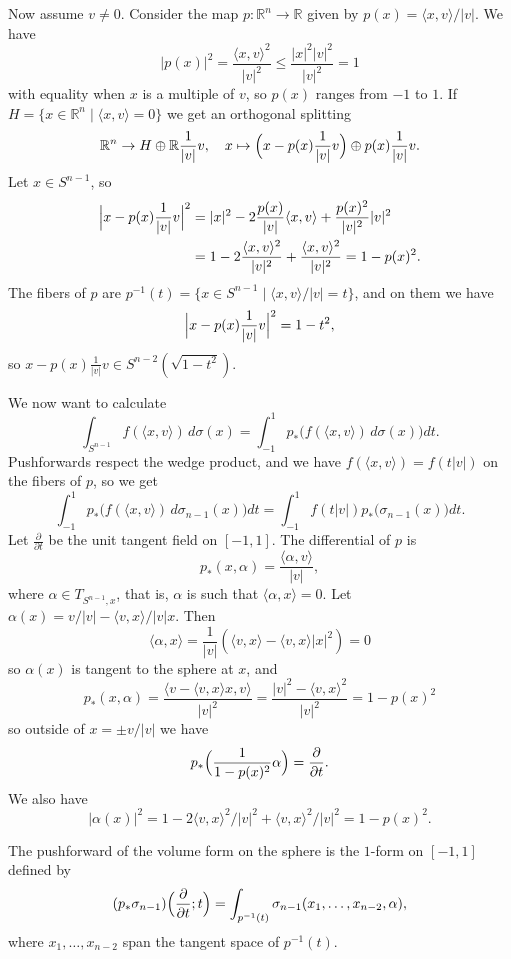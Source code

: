 \documentclass[11pt]{amsart}
\theoremstyle{definition}
\newcommand{\kk}[1]{\mathbb{#1}}
\begin{document}
Now assume $v \not= 0$. Consider the map $p : \kk R^n \to \kk R$ given by $p(x) = \langle x, v \rangle / |v|$.
We have
\[
|p(x)|^2
= \frac{\langle x, v \rangle^2}{|v|^2}
\leq \frac{|x|^2 |v|^2}{|v|^2} = 1
\]
with equality when $x$ is a multiple of $v$, so $p(x)$ ranges from $-1$ to $1$.
If $H = \{ x \in \kk R^n \mid \langle x, v \rangle = 0\}$
we get an orthogonal splitting
\[
\kk R^n \to H \oplus \kk R \frac{1}{|v|}v,
\quad
x \mapsto \Bigl(x - p(x) \frac{1}{|v|} v\Bigr) \oplus p(x) \frac{1}{|v|}v.
\]
Let $x \in S^{n-1}$, so
\begin{align*}
\Bigl|x - p(x)\frac{1}{|v|}v\Bigr|^2
&= |x|^2 - 2 \frac{p(x)}{|v|} \langle x, v \rangle + \frac{p(x)^2}{|v|^2} |v|^2
\\
&= 1 - 2 \frac{\langle x, v \rangle^2}{|v|^2} + \frac{\langle x, v \rangle^2}{|v|^2}
= 1 - p(x)^2.
\end{align*}
The fibers of $p$ are $p^{-1}(t) = \{ x \in S^{n-1} \mid \langle x, v \rangle/|v| = t \}$, and on them we have
\[
\Bigl|x-p(x)\frac{1}{|v|}v\Bigr|^2
= 1 - t^2,
\]
so $x-p(x)\frac{1}{|v|}v \in S^{n-2}(\sqrt{1-t^2})$.

We now want to calculate
\[
\int_{S^{n-1}} f(\langle x, v \rangle) \, d\sigma(x)
= \int_{-1}^{1} p_*\bigl(f(\langle x, v \rangle) \, d\sigma(x)\bigr) dt.
\]
Pushforwards respect the wedge product, and we have $f(\langle x, v \rangle) = f(t|v|)$ on the fibers of $p$, so we get
\[
\int_{-1}^{1} p_*\bigl(f(\langle x, v \rangle) \, d\sigma_{n-1}(x)\bigr) dt
= \int_{-1}^{1} f(t|v|) p_*\bigl(\sigma_{n-1}(x)\bigr) dt.
\]
Let $\frac{\partial}{\partial t}$ be the unit tangent field on $[-1,1]$. The differential of $p$ is
\[
p_*(x, \alpha) = \frac{\langle \alpha, v \rangle}{|v|},
\]
where $\alpha \in T_{S^{n-1},x}$, that is, $\alpha$ is such that $\langle \alpha, x \rangle = 0$. Let $\alpha(x) = v/|v| - \langle v, x \rangle/|v| x$. Then
\[
\langle \alpha, x \rangle
= \frac{1}{|v|}(\langle v, x \rangle - \langle v, x \rangle |x|^2) = 0
\]
so $\alpha(x)$ is tangent to the sphere at $x$,
and
\[
p_*(x, \alpha)
= \frac{\langle v - \langle v, x \rangle x, v \rangle}{|v|^2}
= \frac{|v|^2 - \langle v, x \rangle^2}{|v|^2}
= 1 - p(x)^2
\]
so outside of $x = \pm v/|v|$ we have
\[
p_* \Bigl( \frac{1}{1-p(x)^2} \alpha \Bigr) = \frac{\partial}{\partial t}.
\]
We also have
\[
|\alpha(x)|^2
= 1 - 2 \langle v, x \rangle^2 / |v|^2 + \langle v, x \rangle^2 / |v|^2
= 1 - p(x)^2.
\]

The pushforward of the volume form on the sphere is the $1$-form on $[-1,1]$ defined by
\[
(p_* \sigma_{n-1})\Bigl( \frac{\partial}{\partial t}; t \Bigr)
= \int_{p^{-1}(t)} \sigma_{n-1}(x_1, \ldots, x_{n-2}, \alpha),
\]
where $x_1,\ldots,x_{n-2}$ span the tangent space of $p^{-1}(t)$.
\end{document}
